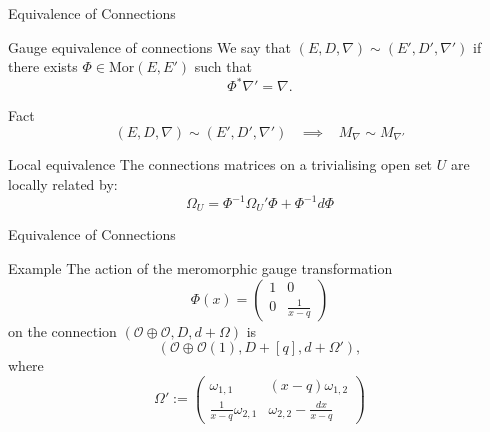\documentclass[10pt,xcolor=svgnames]{beamer} %
\renewcommand{\O}{\mathscr{O}}
\newcommand{\1}{\mathbbm{1}}
\begin{document}
\begin{frame}{Equivalence of Connections}
\begin{exampleblock}{Gauge equivalence of connections}
We say that $(E, D, \nabla)\sim(E',D',\nabla')$ if there exists $\Phi\in\mathrm{Mor}(E, E')$ such that 
\[\Phi^*\nabla'=\nabla.\]
\end{exampleblock}
\begin{exampleblock}{Fact}
	\[(E, D, \nabla)\sim(E',D',\nabla')\;\;\;\implies\;\;\;M_\nabla\sim M_{\nabla'}\]
\end{exampleblock}
\begin{exampleblock}{Local equivalence}
The connections matrices on a trivialising open set $U$ are locally related by: 
\[\Omega_U=\Phi^{-1}\Omega_U'\Phi+\Phi^{-1}d\Phi\]
\end{exampleblock}
\end{frame}



\begin{frame}{Equivalence of Connections}
	\begin{exampleblock}{Example}
	The action of the meromorphic gauge transformation
	\[\Phi(x)=\begin{pmatrix}1&0\\0&\frac{1}{x-q}\end{pmatrix}\]
	on the connection $(\O\oplus\O, D, d+\Omega)$ is
	\[(\O\oplus\O(1), D+[q], d+\Omega'),\]
	where
	\[\Omega':=\begin{pmatrix}\omega_{1,1}&(x-q)\omega_{1,2}\\\frac{1}{x-q}\omega_{2,1}&\omega_{2,2}-\frac{dx}{x-q} \end{pmatrix}\]
	\end{exampleblock}
\end{frame}



\end{document}
